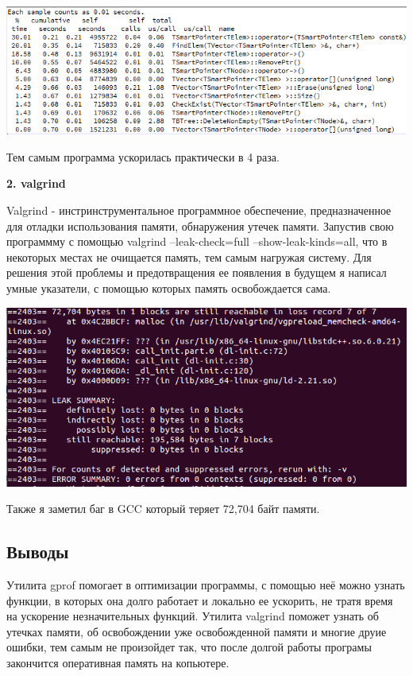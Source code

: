 \documentclass[12pt]{article}
\begin{document}
\noindent \includegraphics{200kBin}

Тем самым программа ускорилась практически в 4 раза.

\par \textbf{2. valgrind}
\par Valgrind - инстринструментальное программное обеспечение, предназначенное для отладки использования памяти, обнаружения утечек памяти. Запустив свою программму с помощью valgrind --leak-check=full --show-leak-kinds=all, что в некоторых местах не очищается память, тем самым нагружая систему. Для решения этой проблемы и предотвращения ее появления в будущем я написал умные указатели, с помощью которых память освобождается сама.

\noindent \includegraphics{valgrind}

Также я заметил баг в GCC который теряет 72,704 байт памяти.
\subsection*{Выводы}

Утилита gprof помогает в оптимизации программы, с помощью неё можно узнать функции, в которых она долго работает и локально ее ускорить, не тратя время на ускорение незначительных функций.
Утилита valgrind поможет узнать об утечках памяти, об освобождении уже освобожденной памяти и многие друие ошибки, тем самым не произойдет так, что после долгой работы програмы закончится оперативная память на копьютере.
\end{document}
